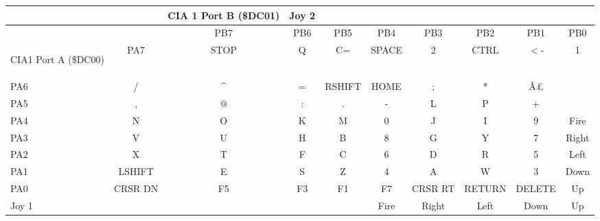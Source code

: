 \documentclass[a4paper]{article}
\begin{document}
{\scriptsize
\begin{tabular}{|p{2cm}|c|c|c|c|c|c|c|c|c|}
\hline 
 & & CIA 1 Port B (\$DC01)  & Joy 2  & & & & & & \\
 \hline 
 & & PB7  & PB6  & PB5  & PB4  & PB3  & PB2  & PB1  & PB0  \\
 \hline 

 \begin{center}
 CIA1 Port A (\$DC00)   
 \end{center}
  & PA7  & STOP  & Q  & C=  & SPACE  & 2  & CTRL  & $<$-  & 1  \\
 \hline 
 PA6  & /  & \^{}  & =  & RSHIFT & HOME  & ;  & *  & \^A{\pounds}  & \\
 \hline 
 PA5  & ,  & @  & :  & .  & -  & L  & P  & +  & \\
 \hline 
 PA4  & N  & O  & K  & M  & 0  & J  & I  & 9  & Fire  \\
 \hline 
 PA3  & V  & U  & H  & B  & 8  & G  & Y  & 7  & Right  \\
 \hline 
 PA2  & X  & T  & F  & C  & 6  & D  & R  & 5  & Left  \\
 \hline 
 PA1  & LSHIFT & E  & S  & Z  & 4  & A  & W  & 3  & Down  \\
 \hline 
 PA0  &CRSR DN & F5  & F3  & F1  & F7  &CRSR RT  & RETURN  & DELETE  & Up  \\
 \hline 
 Joy 1  & & & & & Fire  & Right  & Left  & Down  & Up  \\
 \hline 

\end{tabular}
}
\end{document}
